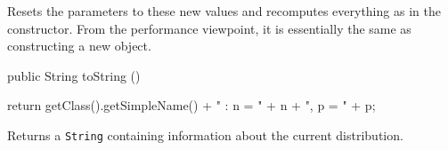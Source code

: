 \begin{tabb}
   Resets the parameters to these new values and recomputes everything
   as in the constructor.  From the performance viewpoint, it is
   essentially the same as constructing a new  object.
\end{tabb}
\begin{hide}\begin{code}

   public String toString ()\begin{hide} {
      return getClass().getSimpleName() + " : n = " + n + ", p = " + p;
   }\end{hide}
\end{code}
\begin{tabb}
   Returns a \texttt{String} containing information about the current distribution.
\end{tabb}\end{hide}
\begin{code}\begin{hide}
}\end{hide}
\end{code}
